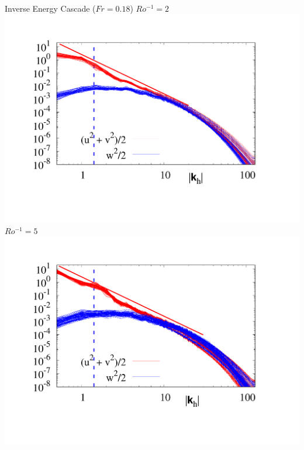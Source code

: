 \documentclass[aspecttatio=169]{beamer}
\begin{document}
\begin{frame}{Inverse Energy Cascade ($Fr = 0.18$)}
        \centering
        {\small $Ro^{-1} = 2$}
        \includegraphics[width=.94\textwidth]{images/Om2Spec.pdf}
    \emp
        \centering
        {\small $Ro^{-1} = 5$}
        \includegraphics[width=.96\textwidth]{images/Om5Spec.pdf}
    \emp

\end{frame}
\end{document}
